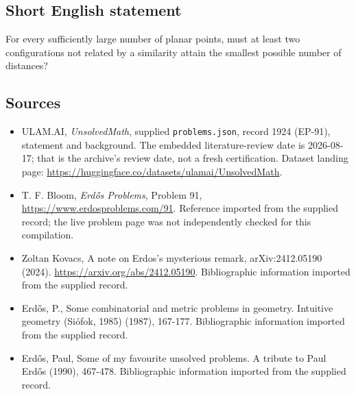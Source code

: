 \documentclass[11pt,a4paper]{article}
\begin{document}
\subsection{Short English statement}

For every sufficiently large number of planar points, must at least two configurations not related by a similarity attain the smallest possible number of distances?

\subsection{Sources}

{\small

\begin{itemize}

\item[\hypertarget{source:1924:1}{S1}] ULAM.AI, \emph{UnsolvedMath}, supplied \texttt{problems.json}, record 1924 (EP-91), statement and background. The embedded literature-review date is 2026-08-17; that is the archive’s review date, not a fresh certification. Dataset landing page: \url{https://huggingface.co/datasets/ulamai/UnsolvedMath}.

\item[\hypertarget{source:1924:2}{S2}] T. F. Bloom, \emph{Erdős Problems}, Problem 91, \url{https://www.erdosproblems.com/91}. Reference imported from the supplied record; the live problem page was not independently checked for this compilation.

\item[\hypertarget{source:1924:3}{S3}] Zoltan Kovacs, A note on Erdos's mysterious remark, arXiv:2412.05190 (2024). \url{https://arxiv.org/abs/2412.05190}. Bibliographic information imported from the supplied record.

\item[\hypertarget{source:1924:4}{S4}] Erd\H{o}s, P., Some combinatorial and metric problems in geometry. Intuitive geometry (Si\'{o}fok, 1985) (1987), 167-177. Bibliographic information imported from the supplied record.

\item[\hypertarget{source:1924:5}{S5}] Erd\H{o}s, Paul, Some of my favourite unsolved problems. A tribute to Paul Erd\H{o}s (1990), 467-478. Bibliographic information imported from the supplied record.

\end{itemize}

}

\label{end:1924}
\end{document}
